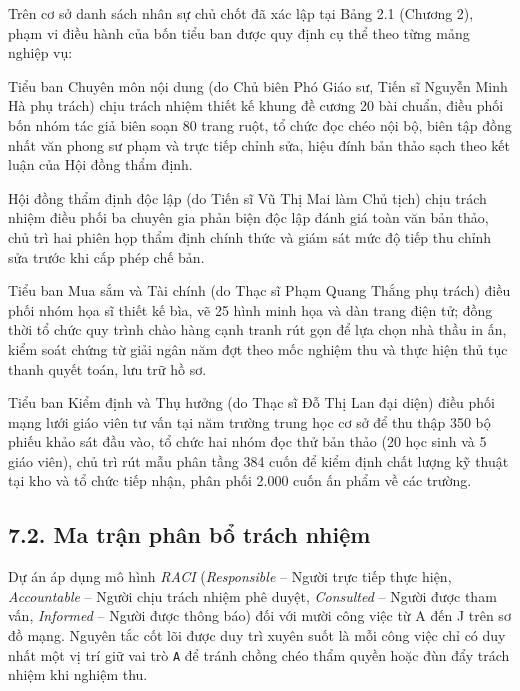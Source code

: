 Trên cơ sở danh sách nhân sự chủ chốt đã xác lập tại Bảng 2.1 (Chương 2), phạm vi điều hành của bốn tiểu ban được quy định cụ thể theo từng mảng nghiệp vụ:

Tiểu ban Chuyên môn nội dung (do Chủ biên Phó Giáo sư, Tiến sĩ Nguyễn Minh Hà phụ trách) chịu trách nhiệm thiết kế khung đề cương 20 bài chuẩn, điều phối bốn nhóm tác giả biên soạn 80 trang ruột, tổ chức đọc chéo nội bộ, biên tập đồng nhất văn phong sư phạm và trực tiếp chỉnh sửa, hiệu đính bản thảo sạch theo kết luận của Hội đồng thẩm định.

Hội đồng thẩm định độc lập (do Tiến sĩ Vũ Thị Mai làm Chủ tịch) chịu trách nhiệm điều phối ba chuyên gia phản biện độc lập đánh giá toàn văn bản thảo, chủ trì hai phiên họp thẩm định chính thức và giám sát mức độ tiếp thu chỉnh sửa trước khi cấp phép chế bản.

Tiểu ban Mua sắm và Tài chính (do Thạc sĩ Phạm Quang Thắng phụ trách) điều phối nhóm họa sĩ thiết kế bìa, vẽ 25 hình minh họa và dàn trang điện tử; đồng thời tổ chức quy trình chào hàng cạnh tranh rút gọn để lựa chọn nhà thầu in ấn, kiểm soát chứng từ giải ngân năm đợt theo mốc nghiệm thu và thực hiện thủ tục thanh quyết toán, lưu trữ hồ sơ.

Tiểu ban Kiểm định và Thụ hưởng (do Thạc sĩ Đỗ Thị Lan đại diện) điều phối mạng lưới giáo viên tư vấn tại năm trường trung học cơ sở để thu thập 350 bộ phiếu khảo sát đầu vào, tổ chức hai nhóm đọc thử bản thảo (20 học sinh và 5 giáo viên), chủ trì rút mẫu phân tầng 384 cuốn để kiểm định chất lượng kỹ thuật tại kho và tổ chức tiếp nhận, phân phối 2.000 cuốn ấn phẩm về các trường.

\subsection{7.2. Ma trận phân bổ trách nhiệm}

Dự án áp dụng mô hình \textit{RACI} (\textit{Responsible} -- Người trực tiếp thực hiện, \textit{Accountable} -- Người chịu trách nhiệm phê duyệt, \textit{Consulted} -- Người được tham vấn, \textit{Informed} -- Người được thông báo) đối với mười công việc từ A đến J trên sơ đồ mạng. Nguyên tắc cốt lõi được duy trì xuyên suốt là mỗi công việc chỉ có duy nhất một vị trí giữ vai trò \texttt{A} để tránh chồng chéo thẩm quyền hoặc đùn đẩy trách nhiệm khi nghiệm thu.

